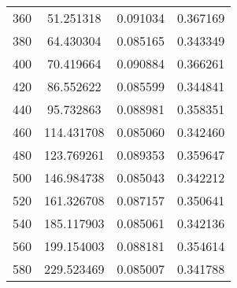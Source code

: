 \documentclass[10pt,a4paper]{article}
\theoremstyle{dotlessP}
\begin{document}
\begin{table}[tbhp]
{\begin{center}
\begin{tabular}{cccc}
360 &  51.251318 &    0.091034 &   0.367169 \\ 
380 &  64.430304 &    0.085165 &   0.343349 \\ 
400 &  70.419664 &    0.090884 &   0.366261 \\ 
420 &  86.552622 &    0.085599 &   0.344841 \\ 
440 &  95.732863 &    0.088981 &   0.358351 \\ 
460 & 114.431708 &    0.085060 &   0.342460 \\ 
480 & 123.769261 &    0.089353 &   0.359647 \\ 
500 & 146.984738 &    0.085043 &   0.342212 \\ 
520 & 161.326708 &    0.087157 &   0.350641 \\ 
540 & 185.117903 &    0.085061 &   0.342136 \\ 
560 & 199.154003 &    0.088181 &   0.354614 \\ 
580 & 229.523469 &    0.085007 &   0.341788 \\
				\hline 
			\end{tabular} 
		\end{center}
	}
\end{table}
\end{document}
